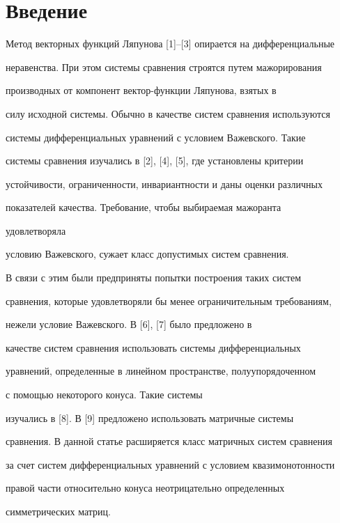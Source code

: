 \label{begin}  


 


\section{Введение} 


 


Метод векторных функций Ляпунова [1]--[3] опирается на дифференциальные 


неравенства. При этом системы сравнения строятся путем мажорирования 


производных от компонент вектор-функции Ляпунова, взятых в 


силу исходной системы. Обычно в качестве систем сравнения используются 


системы дифференциальных уравнений с условием Важевского. Такие 


системы сравнения изучались в [2], [4], [5], где установлены критерии 


устойчивости, ограниченности, инвариантности и даны оценки различных 


показателей качества. Требование, чтобы выбираемая мажоранта 


удовлетворяла 


условию Важевского, сужает класс допустимых систем сравнения. 


В связи с этим были предприняты попытки построения таких систем 


сравнения, которые удовлетворяли бы менее ограничительным требованиям, 


нежели условие Важевского. В [6], [7] было предложено в 


качестве систем сравнения использовать системы дифференциальных 


уравнений, определенные в линейном пространстве, полуупорядоченном 


с помощью некоторого конуса. Такие системы 


изучались в [8]. В [9] предложено использовать матричные системы 


сравнения. В данной статье расширяется класс матричных систем сравнения 


за счет систем дифференциальных уравнений с условием квазимонотонности 


правой части относительно конуса неотрицательно определенных 


симметрических матриц. 


